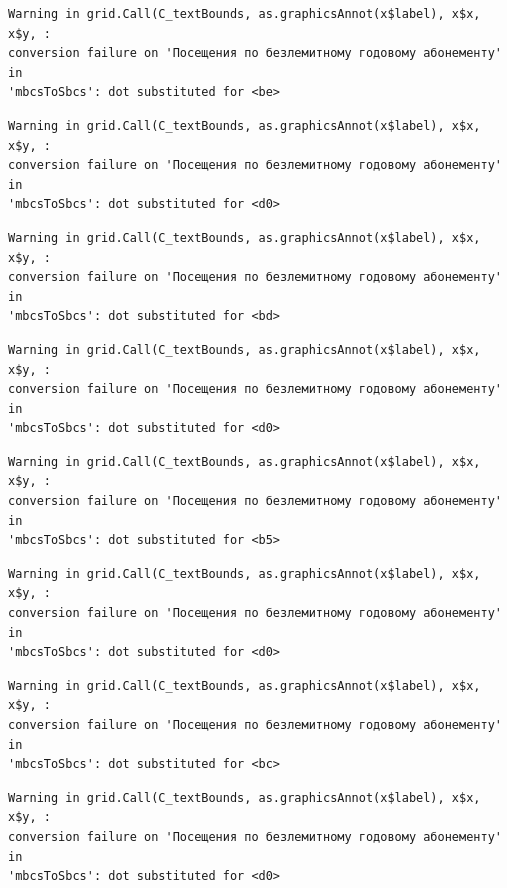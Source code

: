 \documentclass[
  letterpaper,
  DIV=11,
  numbers=noendperiod]{scrartcl}
\begin{document}
\begin{verbatim}
Warning in grid.Call(C_textBounds, as.graphicsAnnot(x$label), x$x, x$y, :
conversion failure on 'Посещения по безлемитному годовому абонементу' in
'mbcsToSbcs': dot substituted for <be>
\end{verbatim}

\begin{verbatim}
Warning in grid.Call(C_textBounds, as.graphicsAnnot(x$label), x$x, x$y, :
conversion failure on 'Посещения по безлемитному годовому абонементу' in
'mbcsToSbcs': dot substituted for <d0>
\end{verbatim}

\begin{verbatim}
Warning in grid.Call(C_textBounds, as.graphicsAnnot(x$label), x$x, x$y, :
conversion failure on 'Посещения по безлемитному годовому абонементу' in
'mbcsToSbcs': dot substituted for <bd>
\end{verbatim}

\begin{verbatim}
Warning in grid.Call(C_textBounds, as.graphicsAnnot(x$label), x$x, x$y, :
conversion failure on 'Посещения по безлемитному годовому абонементу' in
'mbcsToSbcs': dot substituted for <d0>
\end{verbatim}

\begin{verbatim}
Warning in grid.Call(C_textBounds, as.graphicsAnnot(x$label), x$x, x$y, :
conversion failure on 'Посещения по безлемитному годовому абонементу' in
'mbcsToSbcs': dot substituted for <b5>
\end{verbatim}

\begin{verbatim}
Warning in grid.Call(C_textBounds, as.graphicsAnnot(x$label), x$x, x$y, :
conversion failure on 'Посещения по безлемитному годовому абонементу' in
'mbcsToSbcs': dot substituted for <d0>
\end{verbatim}

\begin{verbatim}
Warning in grid.Call(C_textBounds, as.graphicsAnnot(x$label), x$x, x$y, :
conversion failure on 'Посещения по безлемитному годовому абонементу' in
'mbcsToSbcs': dot substituted for <bc>
\end{verbatim}

\begin{verbatim}
Warning in grid.Call(C_textBounds, as.graphicsAnnot(x$label), x$x, x$y, :
conversion failure on 'Посещения по безлемитному годовому абонементу' in
'mbcsToSbcs': dot substituted for <d0>
\end{verbatim}
\end{document}
